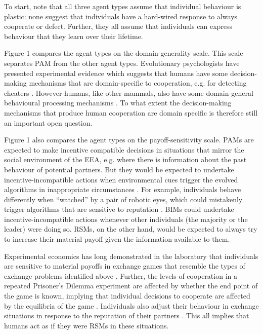\documentclass[10pt, a4paper, fleqn]{article}
\begin{document}
To start, note that all three agent types assume that individual behaviour is plastic: none suggest that individuals have a hard-wired response to always cooperate or defect. Further, they all assume that individuals can express behaviour that they learn over their lifetime. 

Figure 1 compares the agent types on the domain-generality scale. This scale separates PAM from the other agent types. Evolutionary psychologists have presented experimental evidence which suggests that humans have some decision-making mechanisms that are domain-specific to cooperation, e.g. for detecting cheaters \citep{Cosmides:2013:a}. However humans, like other mammals, also have some domain-general behavioural processing mechanisms \citep{Burkart:2016:a}. To what extent the decision-making mechanisms that produce human cooperation are domain specific is therefore still an important open question.

Figure 1 also compares the agent types on the payoff-sensitivity scale. PAMs are expected to make incentive compatible decisions in situations that mirror the social environment of the EEA, e.g. where there is information about the past behaviour of potential partners. But they would be expected to undertake incentive-incompatible actions when environmental cues trigger the evolved algorithms in inappropriate circumstances \citep{Johnson:2003:a,Burnham:2005:a,Hagen:2006:a,Raihani:2015:a}. For example, individuals behave differently when ``watched'' by a pair of robotic eyes, which could mistakenly trigger algorithms that are sensitive to reputation \citep{Burnham:2007:a}. BIMs could undertake incentive-incompatible actions whenever other individuals (the majority or the leader) were doing so. RSMs, on the other hand, would be expected to always try to increase their material payoff given the information available to them.

Experimental economics has long demonstrated in the laboratory that individuals are sensitive to material payoffs in exchange games that resemble the types of exchange problems identified above \citep{Smith:1962:a}. Further, the levels of cooperation in a repeated Prisoner's Dilemma experiment are affected by whether the end point of the game is known, implying that individual decisions to cooperate are affected by the equilibria of the game \citep{Roth:1978:a}. Individuals also adjust their behaviour in exchange situations in response to the reputation of their partners \citep{Milinski:2016:a}. This all implies that humans act as if they were RSMs in these situations. 
\end{document}
